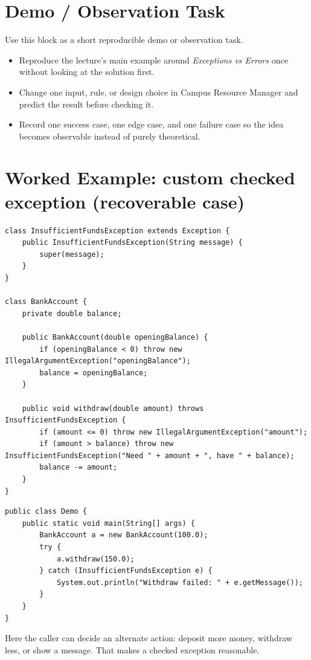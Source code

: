 \documentclass[11pt]{article}
\begin{document}
\section{Demo / Observation Task}
Use this block as a short reproducible demo or observation task.
\begin{itemize}
  \item Reproduce the lecture's main example around \textit{Exceptions vs Errors} once without looking at the solution first.
  \item Change one input, rule, or design choice in Campus Resource Manager and predict the result before checking it.
  \item Record one success case, one edge case, and one failure case so the idea becomes observable instead of purely theoretical.
\end{itemize}
\notesources{\OOPSUnitIIISources}

\section{Worked Example: custom checked exception (recoverable case)}
\begin{lstlisting}
class InsufficientFundsException extends Exception {
    public InsufficientFundsException(String message) {
        super(message);
    }
}

class BankAccount {
    private double balance;

    public BankAccount(double openingBalance) {
        if (openingBalance < 0) throw new IllegalArgumentException("openingBalance");
        balance = openingBalance;
    }

    public void withdraw(double amount) throws InsufficientFundsException {
        if (amount <= 0) throw new IllegalArgumentException("amount");
        if (amount > balance) throw new InsufficientFundsException("Need " + amount + ", have " + balance);
        balance -= amount;
    }
}
\end{lstlisting}

\begin{lstlisting}
public class Demo {
    public static void main(String[] args) {
        BankAccount a = new BankAccount(100.0);
        try {
            a.withdraw(150.0);
        } catch (InsufficientFundsException e) {
            System.out.println("Withdraw failed: " + e.getMessage());
        }
    }
}
\end{lstlisting}
Here the caller can decide an alternate action: deposit more money, withdraw less, or show a message. That makes a checked exception reasonable.
\end{document}
